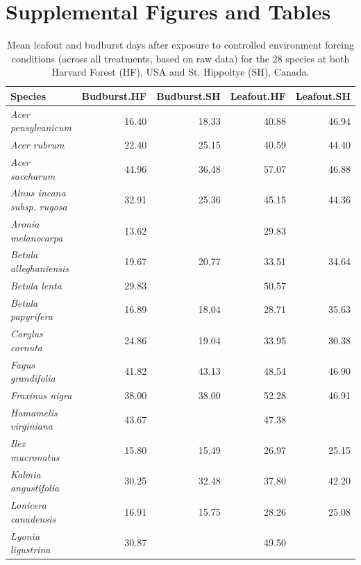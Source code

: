\documentclass{article}
\begin{document}



\newpage
\section*{Supplemental Figures and Tables}


\begin{table}[ht]
\centering
\caption{Mean leafout and budburst days after exposure to controlled environment forcing conditions (across all treatments, based on raw data) for the 28 species at both Harvard Forest (HF), USA and St. Hippoltye (SH), Canada.} 
\begin{tabular}{lrrrr}
  \hline
Species & Budburst.HF & Budburst.SH & Leafout.HF & Leafout.SH \\ 
  \hline
\textit{Acer pensylvanicum} & 16.40 & 18.33 & 40.88 & 46.94 \\ 
  \textit{Acer rubrum} & 22.40 & 25.15 & 40.59 & 44.40 \\ 
  \textit{Acer saccharum} & 44.96 & 36.48 & 57.07 & 46.88 \\ 
  \textit{Alnus incana subsp. rugosa} & 32.91 & 25.36 & 45.15 & 44.36 \\ 
  \textit{Aronia melanocarpa} & 13.62 &  & 29.83 &  \\ 
  \textit{Betula alleghaniensis} & 19.67 & 20.77 & 33.51 & 34.64 \\ 
  \textit{Betula lenta} & 29.83 &  & 50.57 &  \\ 
  \textit{Betula papyrifera} & 16.89 & 18.04 & 28.71 & 35.63 \\ 
  \textit{Corylus cornuta} & 24.86 & 19.04 & 33.95 & 30.38 \\ 
  \textit{Fagus grandifolia} & 41.82 & 43.13 & 48.54 & 46.90 \\ 
  \textit{Fraxinus nigra} & 38.00 & 38.00 & 52.28 & 46.91 \\ 
  \textit{Hamamelis virginiana} & 43.67 &  & 47.38 &  \\ 
  \textit{Ilex mucronatus} & 15.80 & 15.49 & 26.97 & 25.15 \\ 
  \textit{Kalmia angustifolia} & 30.25 & 32.48 & 37.80 & 42.20 \\ 
  \textit{Lonicera canadensis} & 16.91 & 15.75 & 28.26 & 25.08 \\ 
  \textit{Lyonia ligustrina} & 30.87 &  & 49.50 &  \\ 

\end{tabular}
\end{table}
\end{document}
